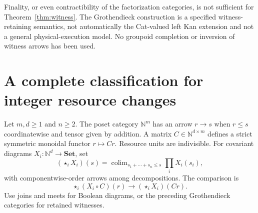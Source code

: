 \documentclass[11pt]{article}
\theoremstyle{definition}\newtheorem{definition}[theorem]{Definition}
\theoremstyle{remark}\newtheorem{remark}[theorem]{Remark}
\newcommand{\Set}{\mathbf{Set}}
\newcommand{\N}{\mathbb N}
\begin{document}
Finality, or even contractibility of the factorization categories, is
not sufficient for Theorem~\ref{thm:witness}. The Grothendieck construction
is a specified witness-retaining semantics, not automatically the
Cat-valued left Kan extension and not a general physical-execution model.
No groupoid completion or inversion of witness arrows has been used.

\section{A complete classification for integer resource changes}\label{sec:resources}
Let $m,d\geq1$ and $n\geq2$. The poset category $\N^m$ has an arrow
$r\to s$ when $r\leq s$ coordinatewise and tensor given by addition.
A matrix $C\in\N^{d\times m}$ defines a strict symmetric monoidal
functor $r\mapsto Cr$. Resource units are indivisible. For covariant
diagrams $X_i:\N^d\to\Set$, set
\[
 (\mathop{\star}_iX_i)(s)
   =\mathop{\operatorname{colim}}_{s_1+\cdots+s_n\leq s}
      \prod_iX_i(s_i),
\]
with componentwise-order arrows among decompositions. The comparison is
\begin{equation}\label{eq:budget}
 \mathop{\star}_i(X_i\circ C)(r)
      \longrightarrow(\mathop{\star}_iX_i)(Cr).
\end{equation}
Use joins and meets for Boolean diagrams, or the preceding Grothendieck
categories for retained witnesses.
\end{document}
